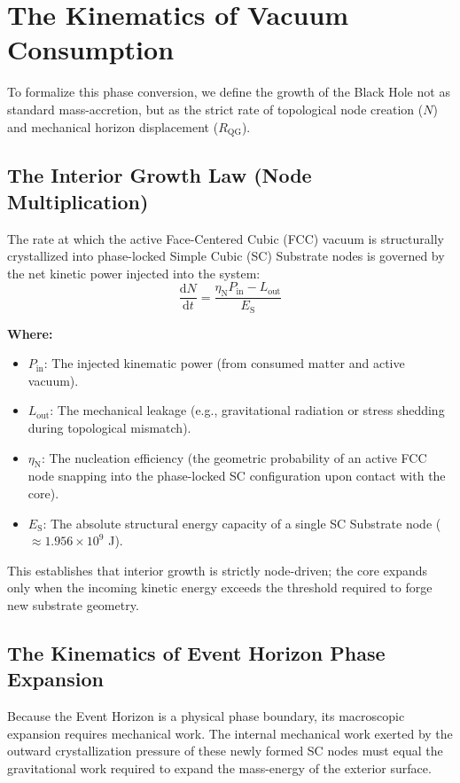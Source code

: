 \vspace{0.5em}
\section{The Kinematics of Vacuum Consumption}
To formalize this phase conversion, we define the growth of the Black Hole not as standard mass-accretion, but as the strict rate of topological node creation ($N$) and mechanical horizon displacement ($R_{\mathrm{QG}}$).

\subsection{The Interior Growth Law (Node Multiplication)}
The rate at which the active Face-Centered Cubic (FCC) vacuum is structurally crystallized into phase-locked Simple Cubic (SC) Substrate nodes is governed by the net kinetic power injected into the system:
\begin{equation}
    \frac{\mathrm{d}N}{\mathrm{d}t} = \frac{\eta_{\mathrm{N}} P_{\mathrm{in}} - L_{\mathrm{out}}}{E_{\mathrm{S}}}
\end{equation}

\noindent\textbf{Where:}
\begin{itemize}
    \item $P_{\mathrm{in}}$: The injected kinematic power (from consumed matter and active vacuum).
    \item $L_{\mathrm{out}}$: The mechanical leakage (e.g., gravitational radiation or stress shedding during topological mismatch).
    \item $\eta_{\mathrm{N}}$: The nucleation efficiency (the geometric probability of an active FCC node snapping into the phase-locked SC configuration upon contact with the core).
    \item $E_{\mathrm{S}}$: The absolute structural energy capacity of a single SC Substrate node ($\approx 1.956 \times 10^9$ J).
\end{itemize}

This establishes that interior growth is strictly node-driven; the core expands only when the incoming kinetic energy exceeds the threshold required to forge new substrate geometry.

\subsection{The Kinematics of Event Horizon Phase Expansion}
Because the Event Horizon is a physical phase boundary, its macroscopic expansion requires mechanical work. The internal mechanical work exerted by the outward crystallization pressure of these newly formed SC nodes must equal the gravitational work required to expand the mass-energy of the exterior surface.

